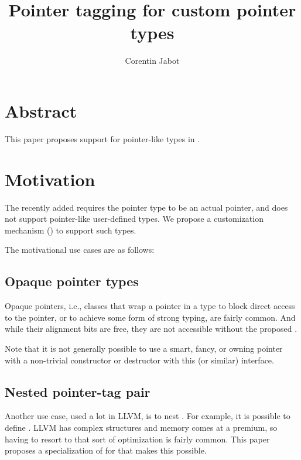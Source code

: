 \documentclass{wg21}
\title{Pointer tagging for custom pointer types}
\author{Corentin Jabot}{corentin.jabot@gmail.com}
\begin{document}
\maketitle

\section{Abstract}

This paper proposes support for pointer-like types in .

\section{Motivation}

The recently added  requires the pointer type to be an actual pointer, and does not support pointer-like user-defined types.
We propose a customization mechanism () to support such types.

The motivational use cases are as follows:

\subsection{Opaque pointer types}

Opaque pointers, i.e., classes that wrap a pointer in a type to block direct access to the pointer, or to achieve some form of strong typing,
are fairly common. And while their alignment bits are free, they are not accessible without the proposed .

Note that it is not generally possible to use a smart, fancy, or owning pointer with a non-trivial constructor or destructor with this (or similar) interface.

\subsection{Nested pointer-tag pair}

Another use case, used a lot in LLVM, is to nest .
For example, it is possible to define .
LLVM has complex structures and memory comes at a premium, so having to resort to that sort of optimization is fairly common.
This paper proposes a specialization of  for  that makes this possible.
\end{document}
